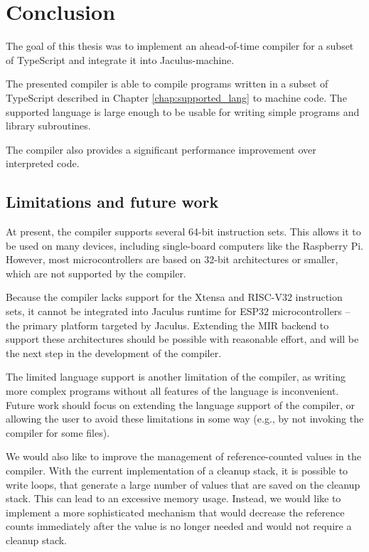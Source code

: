 \chapter{Conclusion}


The goal of this thesis was to implement an ahead-of-time compiler for a subset of TypeScript and integrate it into Jaculus-machine.

The presented compiler is able to compile programs written in a subset of TypeScript described in Chapter \ref{chap:supported_lang} to machine code. The supported language is large enough to be usable for writing simple programs and library subroutines.

The compiler also provides a significant performance improvement over interpreted code.


\section{Limitations and future work}

At present, the compiler supports several 64-bit instruction sets. This allows it to be used on many devices, including single-board computers like the Raspberry Pi. However, most microcontrollers are based on 32-bit architectures or smaller, which are not supported by the compiler.

Because the compiler lacks support for the Xtensa and RISC-V32 instruction sets, it cannot be integrated into Jaculus runtime for ESP32 microcontrollers -- the primary platform targeted by Jaculus. Extending the MIR backend to support these architectures should be possible with reasonable effort, and will be the next step in the development of the compiler.

The limited language support is another limitation of the compiler, as writing more complex programs without all features of the language is inconvenient. Future work should focus on extending the language support of the compiler, or allowing the user to avoid these limitations in some way (e.g., by not invoking the compiler for some files).

We would also like to improve the management of reference-counted values in the compiler. With the current implementation of a cleanup stack, it is possible to write loops, that generate a large number of values that are saved on the cleanup stack. This can lead to an excessive memory usage. Instead, we would like to implement a more sophisticated mechanism that would decrease the reference counts immediately after the value is no longer needed and would not require a cleanup stack.
